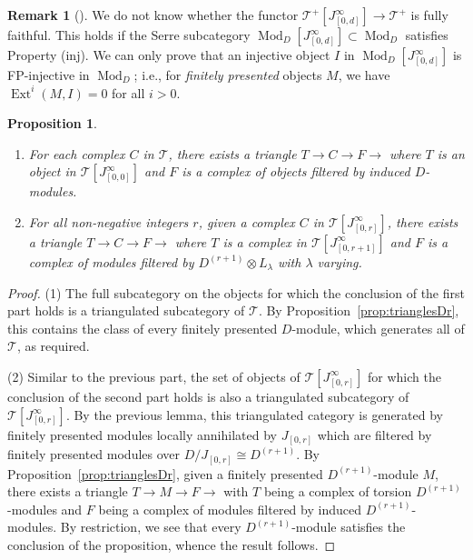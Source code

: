 \documentclass[12pt]{amsart}
\newcommand{\cT}{\mathcal{T}}
\DeclareMathOperator{\ext}{Ext}
\DeclareMathOperator{\Mod}{Mod}
\numberwithin{equation}{section}
\newtheorem{proposition}[equation]{Proposition}
\theoremstyle{definition}
\newtheorem{rmk}[equation]{Remark}
\newenvironment{remark}[1][]{\begin{rmk}[#1] \pushQED{\qed}}{\popQED \end{rmk}}
\theoremstyle{plain}
\begin{document}
\begin{remark}\label{rmk:subtleties}
  We do not know whether the functor $\cT^+[J_{[0,d]}^{\infty}] \to \cT^+$ is fully faithful. This holds if the Serre subcategory $\Mod_D[J_{[0,d]}^{\infty}] \subset \Mod_D$ satisfies Property (inj). We can only prove that an injective object $I$ in $\Mod_D[J_{[0,d]}^{\infty}]$ is FP-injective in $\Mod_D$; i.e., for \textit{finitely presented} objects $M$, we have $\ext^i(M, I) = 0$ for all $i > 0$.
\end{remark}

\begin{proposition}\label{prop:maintriangles}
\leavevmode
    \begin{enumerate}
    \item For each complex $C$ in $\cT$, there exists a triangle 
    $T \to C \to F \to$ where $T$ is an object in $\cT[J_{[0,0]}^{\infty}]$ and $F$ is a complex of objects filtered by induced $D$-modules. 
    \item For all non-negative integers $r$, given a complex $C$ in $\cT[J_{[0,r]}^{\infty}]$, there exists a triangle $T \to C \to F \to$ 
    where $T$ is a complex in $\cT[J_{[0,r+1]}^{\infty}]$ and $F$ is a complex of modules filtered by $D^{(r+1)} \otimes L_{\lambda}$ with $\lambda$ varying. 
    \end{enumerate}
\end{proposition}
\begin{proof}
(1)  The full subcategory on the objects for which the conclusion of the first part holds is a triangulated subcategory of $\cT$. By Proposition~\ref{prop:trianglesDr}, this contains the class of every finitely presented $D$-module, which generates all of $\cT$, as required.

(2) Similar to the previous part, the set of objects of $\cT[J_{[0,r]}^{\infty}]$ for which the conclusion of the second part holds is also a triangulated subcategory of $\cT[J_{[0,r]}^{\infty}]$. By the previous lemma, this triangulated category is generated by finitely presented modules locally annihilated by $J_{[0,r]}$ which are filtered by finitely presented modules over $D/J_{[0,r]} \cong D^{(r+1)}$. By Proposition~\ref{prop:trianglesDr}, given a finitely presented $D^{(r+1)}$-module $M$, there exists a triangle $T \to M \to F \to$ with $T$ being a complex of torsion $D^{(r+1)}$-modules and $F$ being a complex of modules filtered by induced $D^{(r+1)}$-modules. By restriction, we see that every $D^{(r+1)}$-module satisfies the conclusion of the proposition, whence the result follows.
\end{proof}
\end{document}
